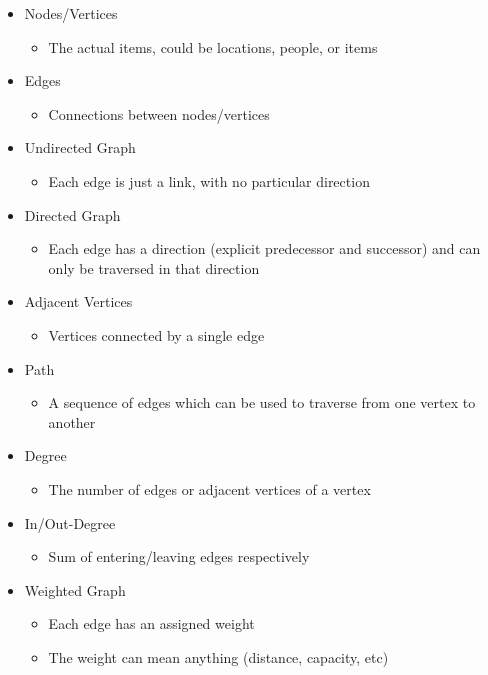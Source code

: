 \begin{itemize}
  \item Nodes/Vertices
  \begin{itemize}
    \item The actual items, could be locations, people, or items
  \end{itemize}
  \item Edges
  \begin{itemize}
    \item Connections between nodes/vertices
  \end{itemize}
  \item Undirected Graph
  \begin{itemize}
    \item Each edge is just a link, with no particular direction
  \end{itemize}
  \item Directed Graph
  \begin{itemize}
    \item Each edge has a direction (explicit predecessor and successor) and can only be traversed in that direction
  \end{itemize}
  \item Adjacent Vertices
  \begin{itemize}
    \item Vertices connected by a single edge
  \end{itemize}
  \item Path
  \begin{itemize}
    \item A sequence of edges which can be used to traverse from one vertex to another
  \end{itemize}
  \item Degree
  \begin{itemize}
    \item The number of edges or adjacent vertices of a vertex
  \end{itemize}
  \item In/Out-Degree
  \begin{itemize}
    \item Sum of entering/leaving edges respectively
  \end{itemize}
  \item Weighted Graph
  \begin{itemize}
    \item Each edge has an assigned weight
    \item The weight can mean anything (distance, capacity, etc)
  \end{itemize}
\end{itemize}

